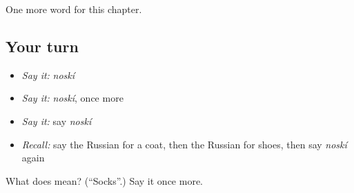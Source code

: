 \begin{grammarlens}[title={What you've built}]
One more word for this chapter.
\end{grammarlens}

\subsection*{Your turn}
\begin{itemize}
\raggedright
  \item \emph{Say it:} \emph{noskí}
  \item \emph{Say it:} \emph{noskí}, once more
  \item \emph{Say it:} say \emph{noskí}
  \item \emph{Recall:} say the Russian for a coat, then the Russian for shoes, then say \emph{noskí} again
\end{itemize}

\begin{tcolorbox}[breakable,colback=teal!4,colframe=teal!35!black,title={Before you move on}]
What does  mean? (\textquotedblleft{}Socks\textquotedblright{}.) Say it once more.
\end{tcolorbox}
